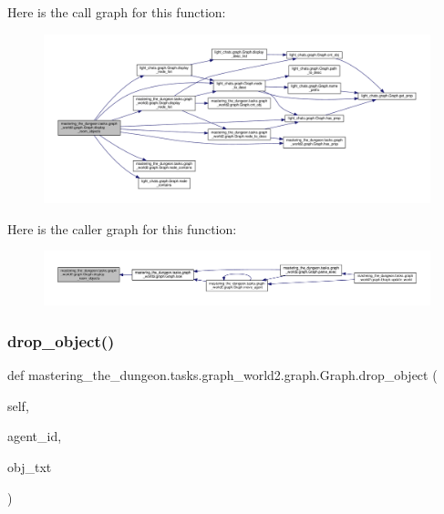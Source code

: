 Here is the call graph for this function\+:
\nopagebreak
\begin{figure}[H]
\begin{center}
\leavevmode
\includegraphics[width=350pt]{classmastering__the__dungeon_1_1tasks_1_1graph__world2_1_1graph_1_1Graph_a1b95c16880df744d95de3fd1213f912f_cgraph}
\end{center}
\end{figure}
Here is the caller graph for this function\+:
\nopagebreak
\begin{figure}[H]
\begin{center}
\leavevmode
\includegraphics[width=350pt]{classmastering__the__dungeon_1_1tasks_1_1graph__world2_1_1graph_1_1Graph_a1b95c16880df744d95de3fd1213f912f_icgraph}
\end{center}
\end{figure}
\mbox{\label{classmastering__the__dungeon_1_1tasks_1_1graph__world2_1_1graph_1_1Graph_a9ba4511655170a43b78a2600d8749a78}} 
\subsubsection{\texorpdfstring{drop\+\_\+object()}{drop\_object()}}
{\footnotesize\ttfamily def mastering\+\_\+the\+\_\+dungeon.\+tasks.\+graph\+\_\+world2.\+graph.\+Graph.\+drop\+\_\+object (\begin{DoxyParamCaption}\item[{}]{self,  }\item[{}]{agent\+\_\+id,  }\item[{}]{obj\+\_\+txt }\end{DoxyParamCaption})}



